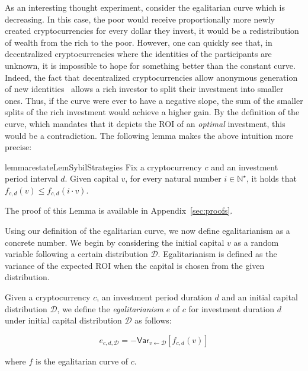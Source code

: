 As an interesting thought experiment, consider the egalitarian curve which is
decreasing. In this case, the poor would receive proportionally more newly
created cryptocurrencies for every dollar they invest, \ie it would be a
redistribution of wealth from the rich to the poor. However, one
can quickly see that, in decentralized cryptocurrencies where the identities of
the participants are unknown, it is impossible to
hope for something better than the constant curve. Indeed, the fact that
decentralized cryptocurrencies allow anonymous generation of new
identities~\cite{douceur2002sybil}
allows a rich investor to split their investment into smaller ones.  Thus, if
the curve were ever to have a negative slope, the sum of the smaller splits of
the rich investment would achieve a higher gain. By the definition of the
curve, which mandates that it depicts the ROI of an \emph{optimal} investment,
this would be a contradiction. The following lemma makes the above intuition
more precise:

\begin{restatable}{lemma}{restateLemSybilStrategies}
\label{lem:sybil}
    Fix a cryptocurrency $c$ and an investment period interval $d$. Given capital $v$,
    for every natural number $i \in \mathbb{N}^\star$, it
    holds that $f_{c,d}(v) \leq f_{c,d}(i \cdot v)$.
\end{restatable}

The proof of this Lemma is available in Appendix~\ref{sec:proofs}.

Using our definition of the egalitarian curve, we now define egalitarianism as
a concrete number. We begin by considering the initial capital $v$ as a random
variable following a certain distribution $\mathcal{D}$. Egalitarianism is
defined as the variance of the expected ROI when the capital is chosen from the
given distribution.

\begin{definition}[Egalitarianism]
  Given a cryptocurrency $c$, an investment period duration $d$ and an initial
  capital distribution $\mathcal{D}$, we define the \emph{egalitarianism} $e$ of $c$
  for investment duration $d$ under initial capital distribution $\mathcal{D}$
  as follows:

  \[
    e_{c,d,\mathcal{D}} = -\textsf{Var}_{v \gets \mathcal{D}}[f_{c,d}(v)]
  \]

  where $f$ is the egalitarian curve of $c$.
\end{definition}

